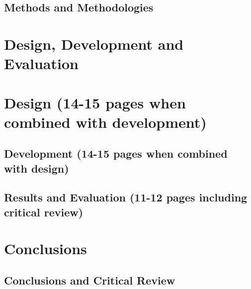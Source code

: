 \documentclass[11pt, a4paper]{article}
\begin{document}
\subsection{Methods and Methodologies}

\section {Design, Development and Evaluation}

\section{Design (14-15 pages when combined with development)}

\subsection {Development (14-15 pages when combined with design)}

\subsection {Results and Evaluation (11-12 pages including critical review)}

\section {Conclusions}

\subsection {Conclusions and Critical Review}

\printbibliography
\end{document}
